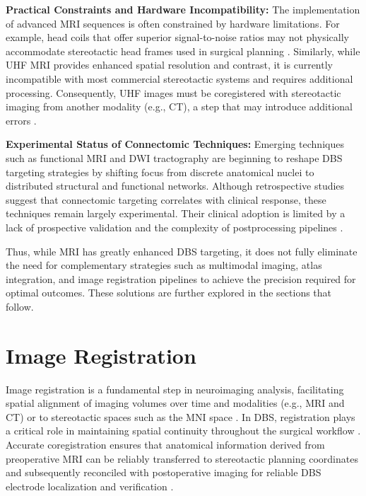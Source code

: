 \textbf{Practical Constraints and Hardware Incompatibility:}
The implementation of advanced MRI sequences is often constrained by hardware limitations. For example, head coils that offer superior signal-to-noise ratios may not physically accommodate stereotactic head frames used in surgical planning \cite{Boutet2021-vg}. Similarly, while UHF MRI provides enhanced spatial resolution and contrast, it is currently incompatible with most commercial stereotactic systems and requires additional processing. Consequently, UHF images must be coregistered with stereotactic imaging from another modality (e.g., CT), a step that may introduce additional errors \cite{Lenglet2012-ii}.

\textbf{Experimental Status of Connectomic Techniques:}
Emerging techniques such as functional MRI and DWI tractography are beginning to reshape DBS targeting strategies by shifting focus from discrete anatomical nuclei to distributed structural and functional networks. Although retrospective studies suggest that connectomic targeting correlates with clinical response, these techniques remain largely experimental. Their clinical adoption is limited by a lack of prospective validation and the complexity of postprocessing pipelines \cite{Horn2017-bi}.

Thus, while MRI has greatly enhanced DBS targeting, it does not fully eliminate the need for complementary strategies such as multimodal imaging, atlas integration, and image registration pipelines to achieve the precision required for optimal outcomes. These solutions are further explored in the sections that follow.

\section{Image Registration}
\label{sec:registration}
Image registration is a fundamental step in neuroimaging analysis, facilitating spatial alignment of imaging volumes over time and modalities (e.g., MRI and CT) or to stereotactic spaces such as the MNI space \cite{Risholm2011-rm}. In DBS, registration plays a critical role in maintaining spatial continuity throughout the surgical workflow \cite{Geevarghese2016-qo}. Accurate coregistration ensures that anatomical information derived from preoperative MRI can be reliably transferred to stereotactic planning coordinates and subsequently reconciled with postoperative imaging for reliable DBS electrode localization and verification \cite{Lofredi2022-wi,Abbass2025-el}.

